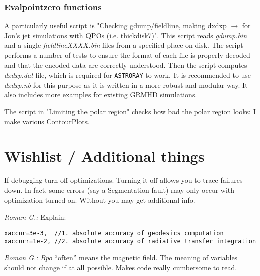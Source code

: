 \documentclass{emulateapj}
\newcommand{\rg}[1]{\color{blue}\textit{Roman G.:} #1\color{black}}
\begin{document}
\subsubsection{Evalpointzero functions}
A particularly useful script is "Checking gdump/fieldline, making
dxdxp $\rightarrow$ for Jon's jet simulations with QPOs
(i.e. thickdisk7)".  This script reads \textit{gdump.bin} and a single
\textit{fieldlineXXXX.bin} files from a specified place on disk.  The
script performs a number of tests to ensure the format of each file is
properly decoded and that the encoded data are correctly understood.
Then the script computes \textit{dxdxp.dat} file, which is required
for {\tt ASTRORAY} to work. It is recommended to use \textit{dxdxp.nb}
for this purpose as it is written in a more robust and modular way. It
also includes more examples for existing GRMHD simulations.

The script in "Limiting the polar region" checks how bad the polar
region looks: I make various ContourPlots.


\section{Wishlist / Additional things}
If debugging turn off optimizations. Turning it off allows you to
trace failures down. In fact, some errors (say a Segmentation fault)
may only occur with optimization turned on. Without you may get
additional info.

\rg{Explain:}
\begin{verbatim}
xaccur=3e-3,  //1. absolute accuracy of geodesics computation
xaccurr=1e-2, //2. absolute accuracy of radiative transfer integration     
\end{verbatim}

\rg{\textit{Bpo} ``often'' means the magnetic field. The meaning of
variables should not change if at all possible. Makes code really
cumbersome to read.}

\newpage %




\end{document}
